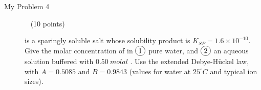 \documentclass[12pt, openany, letterpaper]{memoir}
\begin{document}
\begin{description}
	\vspace{18em}
	\item [My Problem 4] ~ (10 points)
	
	 is a sparingly soluble salt whose solubility product is $K_{SP}=1.6\times10^{-10}$. Give the molar concentration of  in $\circled{1}$ pure water, and $\circled{2}$ an aqueous solution buffered with $0.50~molal$ . Use the extended Debye-H\"uckel law, with $A=0.5085$ and $B=0.9843$ (values for water at $25^\circ C$ and typical ion sizes).
	
\end{description}
\end{document}
